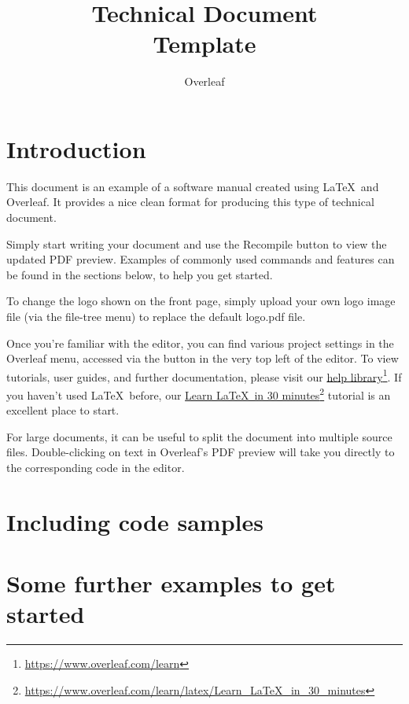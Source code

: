 \documentclass{ol-softwaremanual}
\title{Technical Document \\Template}
\author{Overleaf}
\newcommand{\doclink}[2]{\href{#1}{#2}\footnote{\url{#1}}}
\begin{document}
\maketitle

\tableofcontents
\listoflistings
\newpage

\section{Introduction}

This document is an example of a software manual created using \LaTeX\ and Overleaf. It provides a nice clean format for producing this type of technical document. 

Simply start writing your document and use the Recompile button to view the updated PDF preview. Examples of commonly used commands and features can be found in the sections below, to help you get started.

To change the logo shown on the front page, simply upload your own logo image file (via the file-tree menu) to replace the default logo.pdf file. 

Once you're familiar with the editor, you can find various project settings in the Overleaf menu, accessed via the button in the very top left of the editor. To view tutorials, user guides, and further documentation, please visit our \doclink{https://www.overleaf.com/learn}{help library}. If you haven't used \LaTeX\ before, our \doclink{https://www.overleaf.com/learn/latex/Learn_LaTeX_in_30_minutes}{Learn \LaTeX\ in 30 minutes} tutorial is an excellent place to start.

For large documents, it can be useful to split the document into multiple source files.
Double-clicking on text in Overleaf's PDF preview will take you directly to the corresponding code in the editor.

\section{Including code samples}



\section{Some further examples to get started}


\end{document}
